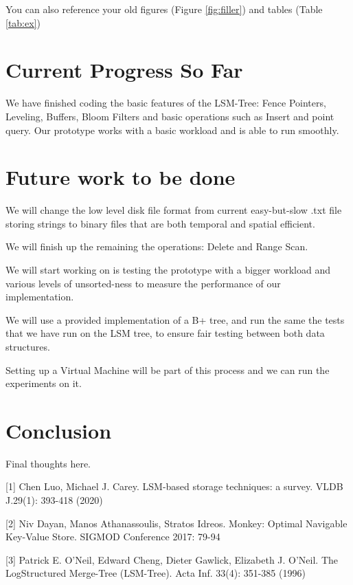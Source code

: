 \documentclass[sigconf]{acmart}
\begin{document}
    You can also reference your old figures (Figure \ref{fig:filler}) and tables
    (Table \ref{tab:ex})

    \section{Current Progress So Far}

    We have finished coding the basic features of the LSM-Tree: Fence Pointers, Leveling, Buffers, Bloom Filters and basic operations such as Insert and point query. Our prototype works with a basic workload and is able to run smoothly.

    \section{Future work to be done}

    We will change the low level disk file format from current easy-but-slow .txt file storing strings to binary files that are both temporal and spatial efficient.

    We will finish up the remaining the operations: Delete and Range Scan.

    We will start working on is testing the prototype with a bigger workload and various levels of unsorted-ness to measure the performance of our implementation.


    We will use a provided implementation of a B+ tree, and run the same the tests that we have run on the LSM tree, to ensure fair testing between both data structures.

    Setting up a Virtual Machine will be part of this process and we can run the experiments on it.

    \section{Conclusion}

    Final thoughts here.

        {
        
        

        [1] Chen Luo, Michael J. Carey. LSM-based storage techniques: a survey. VLDB J.29(1): 393-418 (2020)

        [2] Niv Dayan, Manos Athanassoulis, Stratos Idreos. Monkey: Optimal Navigable
        Key-Value Store. SIGMOD Conference 2017: 79-94

        [3] Patrick E. O'Neil, Edward Cheng, Dieter Gawlick, Elizabeth J. O'Neil. The LogStructured Merge-Tree (LSM-Tree). Acta Inf. 33(4): 351-385 (1996)
    }
\end{document}
